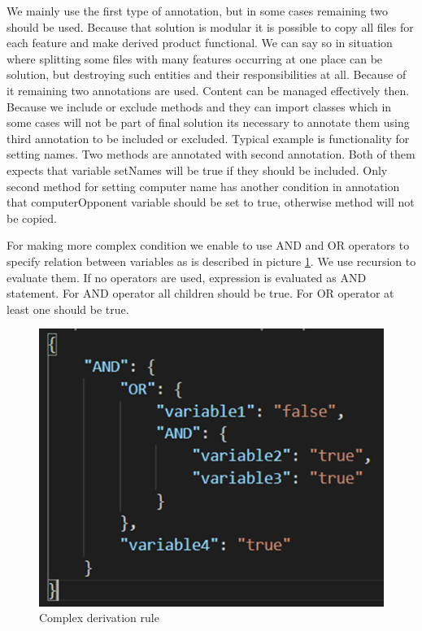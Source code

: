 \documentclass[11pt,english,a4paper,twoside]{article}
\begin{document}
We mainly use the first type of annotation, but in some cases remaining two should be used. Because that solution is modular it is possible to copy all files for each feature and make derived product functional. We can say so in situation where splitting some files with many features occurring at one place can be solution, but destroying such entities and their responsibilities at all. Because of it remaining two annotations are used. Content can be managed effectively then. Because we include or exclude methods and they can import classes which in some cases will not be part of final solution its necessary to annotate them using third annotation to be included or excluded. Typical example is functionality for setting names. Two methods are annotated with second annotation. Both of them expects that variable setNames will be true if they should be included. Only second method for setting computer name has another condition in annotation that computerOpponent variable should be set to true, otherwise method will not be copied. 


For making more complex condition we enable to use AND and OR operators to specify relation between variables as is described in picture \ref{complexDerivationRule}. We use recursion to evaluate them. If no operators are used, expression is evaluated as AND statement. For AND operator all children should be true. For OR operator at least one should be true.


\begin{figure}[H]  %
					\begin{center}
									\includegraphics[width=0.65\linewidth]{fig/expresion.png}
									\caption{Complex derivation rule}
									\label{complexDerivationRule}
					\end{center}
\end{figure}
\end{document}
